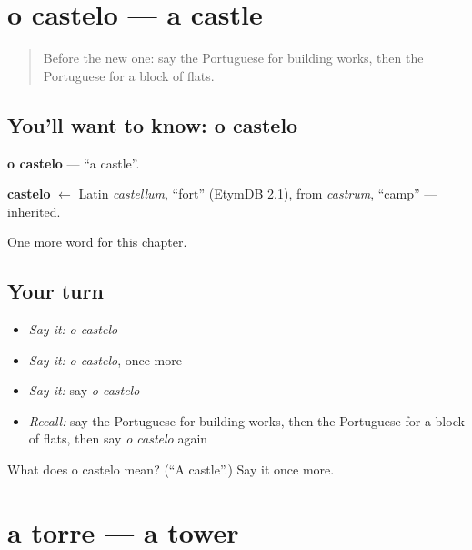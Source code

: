 \section[o castelo]{o castelo — a castle}

\label{lesson:PT-C163-castelo}



\begin{quote}
Before the new one: say the Portuguese for building works, then the Portuguese for a block of flats.
\end{quote}

\subsection*{You'll want to know: o castelo}
\textbf{o castelo} — \textquotedblleft{}a castle\textquotedblright{}.

\begin{cousinweb}
\textbf{castelo} $\leftarrow$ Latin \emph{castellum}, \textquotedblleft{}fort\textquotedblright{} (EtymDB 2.1), from \emph{castrum}, \textquotedblleft{}camp\textquotedblright{} — inherited.
\end{cousinweb}

\begin{grammarlens}[title={What you've built}]
One more word for this chapter.
\end{grammarlens}

\subsection*{Your turn}
\begin{itemize}
\raggedright
  \item \emph{Say it:} \emph{o castelo}
  \item \emph{Say it:} \emph{o castelo}, once more
  \item \emph{Say it:} say \emph{o castelo}
  \item \emph{Recall:} say the Portuguese for building works, then the Portuguese for a block of flats, then say \emph{o castelo} again
\end{itemize}

\begin{tcolorbox}[breakable,colback=teal!4,colframe=teal!35!black,title={Before you move on}]
What does o castelo mean? (\textquotedblleft{}A castle\textquotedblright{}.) Say it once more.
\end{tcolorbox}
\section[a torre]{a torre — a tower}

